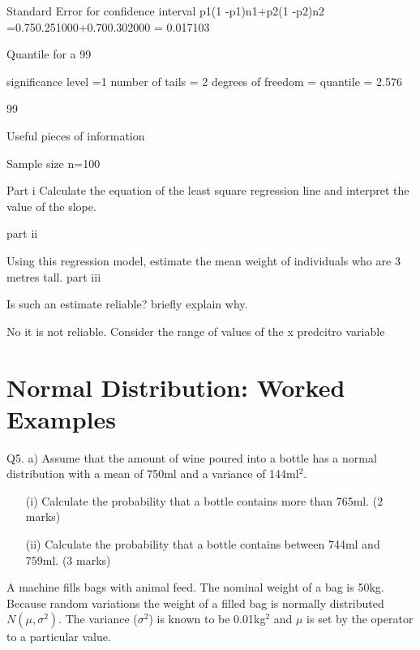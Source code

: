 \documentclass[12pt]{report}
\begin{document}
Standard Error for confidence interval	p1(1 -p1)n1+p2(1 -p2)n2	=0.750.251000+0.700.302000     =  0.017103



Quantile for a 99%

significance level  =1%
number of tails = 2
degrees of freedom = 
quantile = 2.576 


99%



Useful pieces of information


Sample size  n=100




Part i
Calculate the equation of the least square regression line and interpret the value of the slope.

part ii

Using this regression model, estimate the mean weight of individuals who are 3 metres tall.
part iii

Is such an estimate reliable?  briefly explain why.

No it is not reliable. Consider the range of values of the x predcitro variable



\section{Normal Distribution: Worked Examples}



Q5. a) Assume that the amount of wine poured into a bottle has a normal distribution with a mean of 750ml and a variance of 144ml$^2$.

\begin{itemize}

\item[(i)]  Calculate the probability that a bottle contains more than 765ml. (2 marks)
\item[(ii)]    Calculate the probability that a bottle contains between 744ml and 759ml. (3 marks)
\end{itemize}
A machine fills bags with animal feed. The nominal weight of a bag is 50kg.
Because random variations the weight of a filled bag is normally distributed
$N(\mu, \sigma^2)$. The variance ($\sigma^2$) is known to be 0.01kg$^2$ and $\mu$ is set by the
operator to a particular value.
\end{document}
